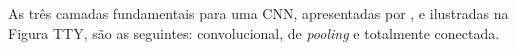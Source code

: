 As três camadas fundamentais para uma CNN, apresentadas por , e ilustradas na Figura TTY, são as seguintes: convolucional, de \textit{pooling} e totalmente conectada.







